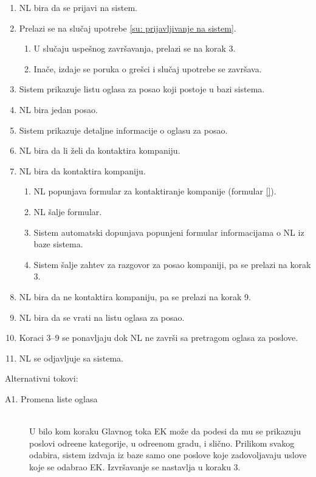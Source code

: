 \begin{enumerate}
	\item NL bira da se prijavi na sistem.
	\item Prelazi se na slu\v caj upotrebe \ref{su: prijavljivanje na sistem}.
	\begin{enumerate}
		\item U slu\v caju uspe\v snog zavr\v savanja, prelazi se na korak 3.
		\item Ina\v ce, izdaje se poruka o gre\v sci i slu\v caj upotrebe se zavr\v sava.
	\end{enumerate}
	\item Sistem prikazuje listu oglasa za posao koji postoje u bazi sistema.
	\item NL bira jedan posao.
	\item Sistem prikazuje detaljne informacije o oglasu za posao.
	\item NL bira da li \v zeli da kontaktira kompaniju.
	\item NL bira da kontaktira kompaniju.
	\begin{enumerate}
		\item NL popunjava formular za kontaktiranje kompanije (formular \ref{}).
		\item NL \v salje formular.
		\item Sistem automatski dopunjava popunjeni formular informacijama o NL iz baze sistema.
		\item Sistem \v salje zahtev za razgovor za posao kompaniji, pa se prelazi na korak 3.
	\end{enumerate}
	\item NL bira da ne kontaktira kompaniju, pa se prelazi na korak 9.
	\item NL bira da se vrati na listu oglasa za posao.
	\item Koraci 3--9 se ponavljaju dok NL ne zavr\v si sa pretragom oglasa za poslove.
	\item NL se odjavljuje sa sistema.
\end{enumerate}

\noindent Alternativni tokovi: 
\begin{description}
	\item[A1. Promena liste oglasa] ~\\
		U bilo kom koraku Glavnog toka EK mo\v ze da podesi da mu se prikazuju poslovi odre\dj ene kategorije, u odre\dj enom gradu, i sli\v cno. Prilikom svakog odabira, sistem izdvaja iz baze samo one poslove koje zadovoljavaju uslove koje se odabrao EK. Izvr\v savanje se nastavlja u koraku 3.
\end{description}

